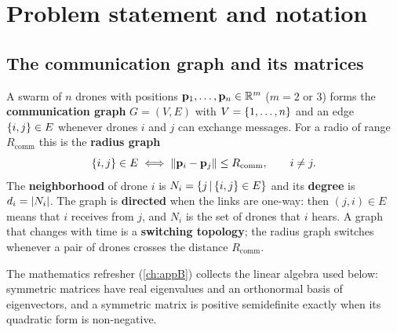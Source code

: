 \section{Problem statement and notation}
\label{sec:ch23-problem}

\subsection{The communication graph and its matrices}

\begin{definition}
\label{def:ch23-graph}
A swarm of $n$ drones with positions $\mathbf{p}_1, \dots, \mathbf{p}_n \in \mathbb{R}^m$
($m = 2$ or $3$) forms the \textbf{communication graph}
$G = (V, E)$ with $V = \left\{ 1, \dots, n \right\}$ and an edge $\left\{ i, j \right\} \in E$ whenever
drones $i$ and $j$ can exchange messages. For a radio of range
$R_{\mathrm{comm}}$ this is the \textbf{radius graph}
\begin{equation}
  \left\{ i, j \right\} \in E \iff \left\lVert \mathbf{p}_i - \mathbf{p}_j \right\rVert \le R_{\mathrm{comm}}, \qquad i \ne j.
  \label{eq:ch23-radius}
\end{equation}
The \textbf{neighborhood} of drone $i$ is
$N_i = \left\{ j \,\middle|\, \left\{ i, j \right\} \in E \right\}$ and its \textbf{degree} is
$d_i = \left\lvert N_i \right\rvert$. The graph is \textbf{directed} when the links are one-way:
then $(j, i) \in E$ means that $i$ receives from $j$, and $N_i$ is the set of
drones that $i$ hears. A graph that changes with time is a \textbf{switching
topology}; the radius graph switches whenever a
pair of drones crosses the distance $R_{\mathrm{comm}}$.
\end{definition}

The mathematics refresher (\cref{ch:appB}) collects the linear algebra used
below: symmetric matrices have real eigenvalues and an orthonormal basis of
eigenvectors, and a symmetric matrix is positive semidefinite exactly when
its quadratic form is non-negative.

